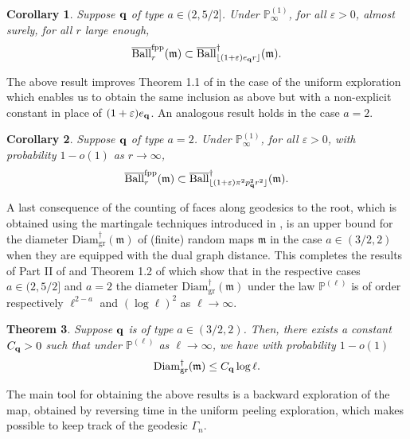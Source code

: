 \documentclass[11pt]{article}
\newtheorem{theorem}{Theorem}[section]
\newtheorem{corollary}[theorem]{Corollary}
\numberwithin{equation}{section}
\def\vp{\varepsilon}
\def\P{\mathbb{P}}
\begin{document}
\begin{corollary}\label{cor inclusion des boules dilue}
	Suppose ${\bf q}$ of type $a \in (2,5/2]$. Under $\P_\infty^{(1)}$, for all $\vp>0$, almost surely, for all $r$ large enough,
	$$
	\overline{\mathrm{Ball}}^{\mathrm{fpp}}_r(\mathfrak{m}) \subset \overline{\mathrm{Ball}}^\dagger_{\lfloor (1+\vp)e_{\bf q}r \rfloor}(\mathfrak{m}).
	$$
\end{corollary}
{The above result improves Theorem 1.1 of \cite{CM20} in the case of the uniform exploration which enables {us} to obtain the same inclusion as above but with a non-explicit constant in place of $(1+\vp)e_{\bf q}$.}
An analogous result holds in the case $a=2$.
\begin{corollary}\label{cor inclusion des boules cas Cauchy}
	Suppose $\bf q$  of type $a=2$. Under $\P_\infty^{(1)}$, for all $\vp>0$, with probability $1-o(1)$ as $r \to \infty$, 
	$$
	\overline{\mathrm{Ball}}^{\mathrm{fpp}}_{r} (\mathfrak{m}) 
	\subset \overline{\mathrm{Ball}}^{\mathrm{\dagger}}_{\lfloor (1+\vp) \pi^2p^2_{\bf q} r^2\rfloor}(\mathfrak{m})  .
	$$
\end{corollary}
A last consequence of the counting of faces along geodesics to the root, which is obtained using the martingale techniques introduced in \cite{Kam23}, is an upper bound for the diameter $\mathrm{Diam}^\dagger_{\mathrm{gr}}(\mathfrak{m})$ of (finite) random maps $\mathfrak{m}$ in the case $a \in (3/2,2)$ when they are equipped with the dual graph distance. {This completes the results of Part II of \cite{BCR24} and Theorem 1.2 of \cite{Kam23} which show that in the respective cases $a\in (2,5/2]$ and $a=2$ the diameter $\mathrm{Diam}^\dagger_{\mathrm{gr}}(\mathfrak{m})$ under the law $\P^{(\ell)}$ is of order respectively $\ell^{2-a}$ and $(\log \ell)^2$ as $\ell \to \infty$.}
\begin{theorem}\label{th diametre cas dense}
	Suppose ${\bf q}$ is of type $a \in (3/2,2)$. Then, there exists a constant $C_{\bf q}>0$ such that under $\P^{(\ell)}$ as $\ell \to \infty$, we have with probability $1-o(1)$
	$$
	\mathrm{Diam}_{\mathrm{gr}}^\dagger
	(\mathfrak{m})
	\le C_{\bf q}  \log \ell.
	$$
\end{theorem}
The main tool for obtaining the above results is a backward exploration of the map, obtained by reversing time in the uniform peeling exploration, which {makes possible} to keep track of the geodesic $\Gamma_n$.
\end{document}
